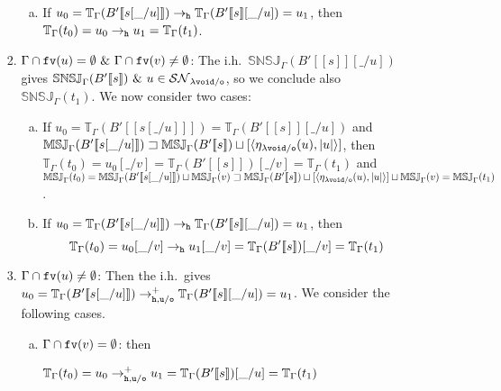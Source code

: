 \documentclass{LMCS}
\renewcommand{\>}{\rightarrow}
\def\lam{\lambda}
\def\Gam{\Gamma}
\newcommand{\Rew}[1]{\rightarrow_{#1}}
\newcommand{\SN}[1]{\mathcal{SN}_{#1}}
\newcommand{\multiset}[1]{ [ #1 ] }
\newcommand{\pair}[2]{\langle #1, #2 \rangle}
\newcommand{\Rewplus}[1]{\rightarrow^{+}_{#1}}
\newcommand{\fv}[1]{{\tt fv}(#1)}
\newcommand{\ems}{\emptyset}
\newcommand{\ih}{i.h.}
\newcommand{\unboxed}{{\tt u}}
\newcommand{\modulo}[2]{#1/#2}
\newcommand{\osym}{{\tt o}}
\newcommand{\osymb}{{\tt o}}
\newcommand{\aux}{{\tt void}}
\newcommand{\lauxm}{\lam\modulo{ \aux }{ \osymb }}
\newcommand{\New}{{\tt h}}
\newcommand{\snsudd}[2]{\mathbb{SNSJ}_{#1}(#2)}
\newcommand{\ctx}[2]{#1 [ \! [#2] \! ]}
\newcommand{\etamd}[2]{\mathbb{MSJ}_{#1}(#2)}
\newcommand{\surf}[2]{\mathbb{T}_{#1}(#2)}
\newcommand{\void}{\_}
\newcommand{\gm}{\sqsupset}
\begin{document}
\begin{enumerate}[$\bullet$]
\begin{enumerate}[$-$]
\begin{enumerate}[(1)]
\begin{enumerate}[(a)]
        \item If $u_0=\surf{\Gam}{\ctx{B'}{s[\void/u]}} \Rew{\New}
          \surf{\Gam}{\ctx{B'}{s}[\void/u]}=u_1$, then $\surf{\Gam}{t_0} =
          u_0 \Rew{\New}
          u_1  = \surf{\Gam}{t_1}$.
        \end{enumerate}        
  \item \emph{$\Gam\cap\fv{u}=\ems\ \&\ \Gam\cap\fv{v}\neq\ems$}: 
        The  \ih\ 
        $\snsudd{\Gam}{\ctx{B'}{s}[\void/u]}$ gives
        $\snsudd{\Gam}{\ctx{B'}{s}}\ \&\ u \in \SN{\lauxm}$, so 
        we conclude also $\snsudd{\Gam}{t_1}$. We now consider two cases:  
         
        \begin{enumerate}[(a)]
        \item If $u_0= \surf{\Gam}{\ctx{B'}{s[\void/u]}} = \surf{\Gam}{\ctx{B'}{s}[\void/u]}$
              and $\etamd{\Gam}{\ctx{B'}{s[\void/u]}}  \gm \etamd{\Gam}{\ctx{B'}{s}} \sqcup
                  \multiset{\pair{\eta_{\lauxm}(u)}{|u|}}$, 
        then $\surf{\Gam}{t_0} = u_0[\void/v] = 
              \surf{\Gam}{\ctx{B'}{s}}[\void/v] = 
              \surf{\Gam}{t_1}$ and 
        $\etamd{\Gam}{t_0} = \etamd{\Gam}{\ctx{B'}{s[\void/u]}}  \sqcup
                  \etamd{\Gam}{v} \gm \etamd{\Gam}{\ctx{B'}{s}} \sqcup
                  \multiset{\pair{\eta_{\lauxm}(u)}{|u|}} \sqcup
                  \etamd{\Gam}{v}  = \etamd{\Gam}{t_1}$.
        \item If $u_0=\surf{\Gam}{\ctx{B'}{s[\void/u]}} \Rew{\New}
          \surf{\Gam}{\ctx{B'}{s}[\void/u]}=u_1$, then 
          $$ \surf{\Gam}{t_0} =
          u_0[\void/v] \Rew{\New}
          u_1[\void/v] = \surf{\Gam}{\ctx{B'}{s}}[\void/v] = 
          \surf{\Gam}{t_1} $$  
        \end{enumerate}   
  \item \emph{$\Gam\cap\fv{u} \neq \ems$}: Then the \ih\ gives
    $u_0=\surf{\Gam}{\ctx{B'}{s[\void/u]}}
    \Rewplus{\modulo{\New,\unboxed}{\osym}}
    \surf{\Gam}{\ctx{B'}{s}[\void/u]}=u_1$. We consider the following cases.

    \begin{enumerate}[(a)]
    \item \emph{$\Gam\cap\fv{v}= \ems$}:  then
\begin{center}$ \surf{\Gam}{t_0} = u_0  \Rewplus{\modulo{\New,\unboxed}{\osym}}
     u_1 = \surf{\Gam}{\ctx{B'}{s}}[\void/u] = \surf{\Gam}{t_1}$\end{center}


\end{enumerate}
\end{enumerate}
\end{enumerate}
\end{enumerate}
\end{document}
